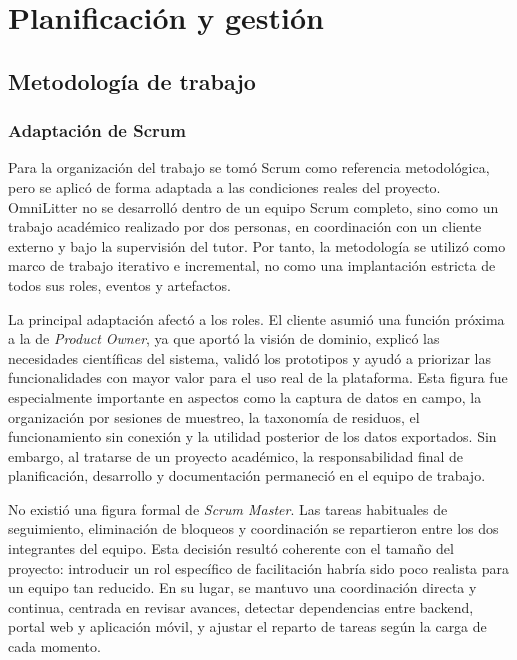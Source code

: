
\chapter{Planificación y gestión}
\label{sec:planificacion_gestion}

\section{Metodología de trabajo}

\subsection{Adaptación de Scrum}

Para la organización del trabajo se tomó Scrum como referencia metodológica, pero
se aplicó de forma adaptada a las condiciones reales del proyecto. OmniLitter no
se desarrolló dentro de un equipo Scrum completo, sino como un trabajo académico
realizado por dos personas, en coordinación con un cliente externo y bajo la
supervisión del tutor. Por tanto, la metodología se utilizó como marco de trabajo
iterativo e incremental, no como una implantación estricta de todos sus roles,
eventos y artefactos.

La principal adaptación afectó a los roles. El cliente asumió una función próxima
a la de \textit{Product Owner}, ya que aportó la visión de dominio, explicó las
necesidades científicas del sistema, validó los prototipos y ayudó a priorizar las
funcionalidades con mayor valor para el uso real de la plataforma. Esta figura fue
especialmente importante en aspectos como la captura de datos en campo, la
organización por sesiones de muestreo, la taxonomía de residuos, el funcionamiento
sin conexión y la utilidad posterior de los datos exportados. Sin embargo, al
tratarse de un proyecto académico, la responsabilidad final de planificación,
desarrollo y documentación permaneció en el equipo de trabajo.

No existió una figura formal de \textit{Scrum Master}. Las tareas habituales de
seguimiento, eliminación de bloqueos y coordinación se repartieron entre los dos
integrantes del equipo. Esta decisión resultó coherente con el tamaño del proyecto:
introducir un rol específico de facilitación habría sido poco realista para un
equipo tan reducido. En su lugar, se mantuvo una coordinación directa y continua,
centrada en revisar avances, detectar dependencias entre backend, portal web y
aplicación móvil, y ajustar el reparto de tareas según la carga de cada momento.

